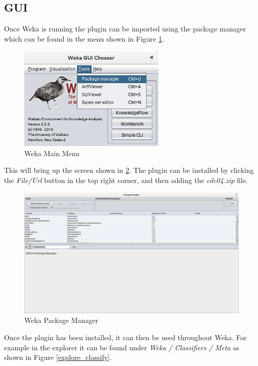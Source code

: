 \subsection{GUI}

Once Weka is running the plugin can be imported using the package manager which can be found in the menu shown in Figure \ref{main}.
\begin{figure}[ht!]
\centering
\includegraphics[width=70mm]{weka_main_screen.png}
\caption{Weka Main Menu \label{main}}
\end{figure}

This will bring up the screen shown in \ref{package_man}. The plugin can be installed by clicking the \textit{File/Url} button in the top right corner, and then adding the \textit{cdc04.zip} file.

\begin{figure}[ht!]
\centering
\includegraphics[width=160mm]{package_manager.png}
\caption{Weka Package Manager \label{package_man}}
\end{figure}

Once the plugin has been installed, it can then be used throughout Weka. For example in the explorer it can be found under \textit{Weka / Classifiers / Meta} as shown in Figure \ref{explore_classify}.

